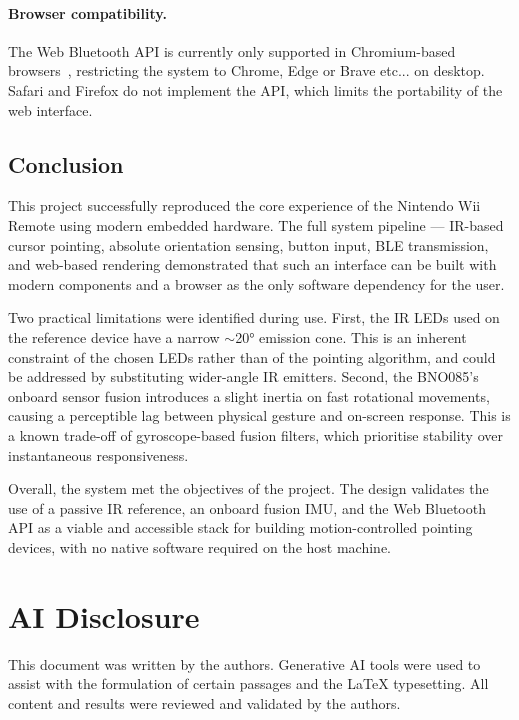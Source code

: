 \documentclass[12pt, a4paper]{article}
\begin{document}
\paragraph{Browser compatibility.}
The Web Bluetooth API is currently only supported in Chromium-based browsers~\cite{chrome_bluetooth}, restricting the system to Chrome, Edge or Brave etc... on desktop. Safari and Firefox do not implement the API, which limits the portability of the web interface.


\subsection{Conclusion}

This project successfully reproduced the core experience of the Nintendo Wii Remote using modern embedded hardware. The full system pipeline — IR-based cursor pointing, absolute orientation sensing, button input, BLE transmission, and web-based rendering demonstrated that such an interface can be built with modern components and a browser as the only software dependency for the user.

Two practical limitations were identified during use. First, the IR LEDs used on the reference device have a narrow $\sim$20° emission cone. This is an inherent constraint of the chosen LEDs rather than of the pointing algorithm, and could be addressed by substituting wider-angle IR emitters. Second, the BNO085's onboard sensor fusion introduces a slight inertia on fast rotational movements, causing a perceptible lag between physical gesture and on-screen response. This is a known trade-off of gyroscope-based fusion filters, which prioritise stability over instantaneous responsiveness.

Overall, the system met the objectives of the project. The design validates the use of a passive IR reference, an onboard fusion IMU, and the Web Bluetooth API as a viable and accessible stack for building motion-controlled pointing devices, with no native software required on the host machine.

\section*{AI Disclosure}

This document was written by the authors. Generative AI tools were used to assist with the formulation of certain passages and the \LaTeX{} typesetting. All content and results were reviewed and validated by the authors.
\end{document}

